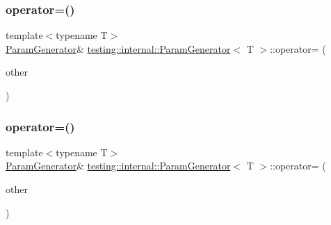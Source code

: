 \mbox{\label{classtesting_1_1internal_1_1_param_generator_a590a03c6e0a3a3ac6279943ad1f01dc8}} 
\subsubsection{\texorpdfstring{operator=()}{operator=()}\hspace{0.1cm}{\footnotesize\ttfamily [1/3]}}
{\footnotesize\ttfamily template$<$typename T$>$ \\
\mbox{\hyperlink{classtesting_1_1internal_1_1_param_generator}{Param\+Generator}}\& \mbox{\hyperlink{classtesting_1_1internal_1_1_param_generator}{testing\+::internal\+::\+Param\+Generator}}$<$ T $>$\+::operator= (\begin{DoxyParamCaption}\item[{const \mbox{\hyperlink{classtesting_1_1internal_1_1_param_generator}{Param\+Generator}}$<$ T $>$ \&}]{other }\end{DoxyParamCaption})\hspace{0.3cm}{\ttfamily [inline]}}

\mbox{\label{classtesting_1_1internal_1_1_param_generator_a590a03c6e0a3a3ac6279943ad1f01dc8}} 
\subsubsection{\texorpdfstring{operator=()}{operator=()}\hspace{0.1cm}{\footnotesize\ttfamily [2/3]}}
{\footnotesize\ttfamily template$<$typename T$>$ \\
\mbox{\hyperlink{classtesting_1_1internal_1_1_param_generator}{Param\+Generator}}\& \mbox{\hyperlink{classtesting_1_1internal_1_1_param_generator}{testing\+::internal\+::\+Param\+Generator}}$<$ T $>$\+::operator= (\begin{DoxyParamCaption}\item[{const \mbox{\hyperlink{classtesting_1_1internal_1_1_param_generator}{Param\+Generator}}$<$ T $>$ \&}]{other }\end{DoxyParamCaption})\hspace{0.3cm}{\ttfamily [inline]}}

